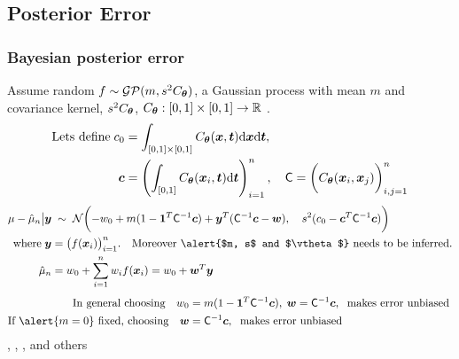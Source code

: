 \documentclass[10pt,compress,xcolor={usenames,dvipsnames}]{beamer} %
\newcommand{\bm}[1]{\boldsymbol{#1}}
\newcommand{\mCInv}{\mC^{-1}}
\newcommand{\dvx}{\dif {\vx}}
\newcommand{\dvt}{\dif {\vt}}
\begin{document}
\subsection{Posterior Error}


\begin{frame}
\frametitle{Bayesian posterior error}
\vspace*{-4ex}
\alert{Assume random}
$f \sim \mathcal{GP} (m, s^2C_{\boldsymbol{\theta}})$,
a \alert{Gaussian process} with mean $m$ and covariance kernel, $s^2C_{\boldsymbol{\theta}}$, $C_{\boldsymbol{\theta}}:[0,1] \times [0,1] \to \mathbb{R}$ .
\vspace*{-1ex}
\begin{align*}
\text{Lets define} \; c_0 &= \int_{[0,1] \times [0,1]} C_{\vtheta} (\vx,\vt) \dvx \dvt, 
\\
\vc& = \left( \int_{[0,1] } C_{\vtheta} (\vx_i,\vt) \dvt \right)_{i=1}^n,
\quad
\mC =  \biggl( C_{\vtheta} (\vx_i,\vx_j) \biggr)_{i,j=1}^n
\end{align*}
\pause
\vspace*{-3ex}
\begin{align*}
\mu - \hmu_n  \big \vert \vy & \; \sim \;
\cn
\biggl(-w_0 +
m(1- \bm{1}^T \mathsf{C}^{-1}\vc) +
\vy^T (\mathsf{C}^{-1}\vc - \vw), \quad s^2(c_0 - \vc ^T \mathsf{C}^{-1} \vc)
\biggr)
\\
\text{where} \; \vy &= \bigl(f(\vx_i)\bigr)_{i=1}^n. \quad \text{Moreover \alert{$m, s$ and $\vtheta$} needs to be inferred}.
\\
\hmu_n &= w_0 + \sum_{i=1}^n w_i f(\vx_i) = w_0 + \vw^T \vy
\end{align*}
\pause
\vspace*{-3ex}
\begin{align*}
\text{In general choosing} \quad
w_0 & = m(1 - \vone^T \mCInv \vc)
, 
\;
\vw = \mathsf{C}^{-1}\vc, \; \text{ makes error unbiased }
\\
\text{If $\alert{m = 0}$ fixed, choosing} \quad
\vw & =
\mathsf{C}^{-1}\vc, \; \text{ makes error unbiased }
\end{align*}
, , ,  and others
\end{frame}
\end{document}
